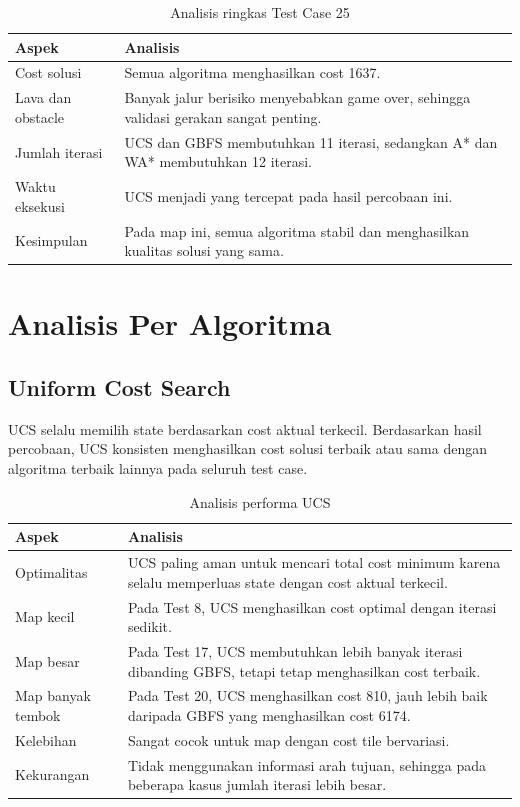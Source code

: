 \begin{table}[H]
	\centering
	\caption{Analisis ringkas Test Case 25}
	\begin{tabular}{|p{4cm}|p{10cm}|}
		\hline
		\rowcolor{blue!15}
		\textbf{Aspek} & \textbf{Analisis} \\
		\hline
		Cost solusi & Semua algoritma menghasilkan cost 1637. \\
		\hline
		Lava dan obstacle & Banyak jalur berisiko menyebabkan game over, sehingga validasi gerakan sangat penting. \\
		\hline
		Jumlah iterasi & UCS dan GBFS membutuhkan 11 iterasi, sedangkan A* dan WA* membutuhkan 12 iterasi. \\
		\hline
		Waktu eksekusi & UCS menjadi yang tercepat pada hasil percobaan ini. \\
		\hline
		Kesimpulan & Pada map ini, semua algoritma stabil dan menghasilkan kualitas solusi yang sama. \\
		\hline
	\end{tabular}
\end{table}


\section{Analisis Per Algoritma}

\subsection{Uniform Cost Search}

UCS selalu memilih state berdasarkan cost aktual terkecil. 
Berdasarkan hasil percobaan, UCS konsisten menghasilkan cost solusi terbaik atau sama dengan algoritma terbaik lainnya pada seluruh test case.

\begin{table}[H]
	\centering
	\caption{Analisis performa UCS}
	\begin{tabular}{|p{4cm}|p{10cm}|}
		\hline
		\rowcolor{green!15}
		\textbf{Aspek} & \textbf{Analisis} \\
		\hline
		Optimalitas & UCS paling aman untuk mencari total cost minimum karena selalu memperluas state dengan cost aktual terkecil. \\
		\hline
		Map kecil & Pada Test 8, UCS menghasilkan cost optimal dengan iterasi sedikit. \\
		\hline
		Map besar & Pada Test 17, UCS membutuhkan lebih banyak iterasi dibanding GBFS, tetapi tetap menghasilkan cost terbaik. \\
		\hline
		Map banyak tembok & Pada Test 20, UCS menghasilkan cost 810, jauh lebih baik daripada GBFS yang menghasilkan cost 6174. \\
		\hline
		Kelebihan & Sangat cocok untuk map dengan cost tile bervariasi. \\
		\hline
		Kekurangan & Tidak menggunakan informasi arah tujuan, sehingga pada beberapa kasus jumlah iterasi lebih besar. \\
		\hline
	\end{tabular}
\end{table}

